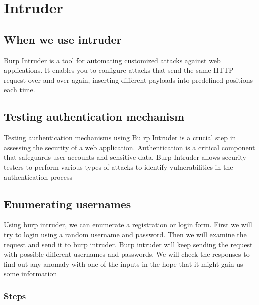 \documentclass[
	a4paper, %
	12pt, %
]{CSSullivanBusinessReport}
\begin{document}
\section{Intruder}

\subsection*{When we use intruder}

\begin{fullwidth}Burp Intruder is a tool for automating customized attacks against web applications. It enables you to configure attacks that send the same HTTP request over and over again, inserting different payloads into predefined positions each time.\end{fullwidth}



\subsection*{Testing authentication mechanism}

\begin{fullwidth}Testing authentication mechanisms using Bu rp Intruder is a crucial step in assessing the security of a web application. Authentication is a critical component that safeguards user accounts and sensitive data. Burp Intruder allows security testers to perform various types of attacks to identify vulnerabilities in the authentication process\end{fullwidth}



\subsection*{Enumerating usernames}

\begin{fullwidth}Using burp intruder, we can enumerate a registration or login form. First we will try to login using a random username and password. Then we will examine the request and send it to burp intruder. Burp intruder will keep sending the request with possible different usernames and passwords. We will check the responses to find out any anomaly with one of the inputs in the hope that it might gain us some information \end{fullwidth}


\subsubsection*{Steps}
\end{document}
